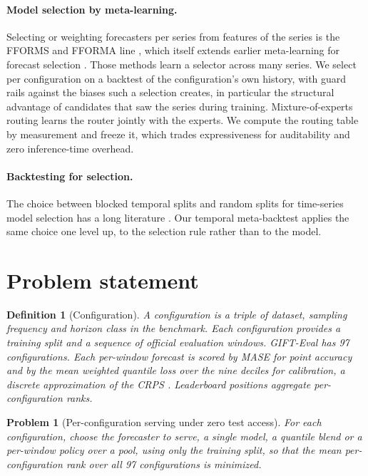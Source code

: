 \documentclass[11pt]{article}
\newtheorem{definition}{Definition}
\newtheorem{problem}{Problem}
\begin{document}
\paragraph{Model selection by meta-learning.} Selecting or weighting
forecasters per series from features of the series is the FFORMS and
FFORMA line \citep{talagala2023fforms,montero2020fforma}, which itself
extends earlier meta-learning for forecast selection
\citep{lemke2010metalearning}. Those methods learn a selector across many
series. We select per configuration on a backtest of the configuration's
own history, with guard rails against the biases such a selection creates,
in particular the structural advantage of candidates that saw the series
during training. Mixture-of-experts routing \citep{shazeer2017moe} learns
the router jointly with the experts. We compute the routing table by
measurement and freeze it, which trades expressiveness for auditability
and zero inference-time overhead.

\paragraph{Backtesting for selection.} The choice between blocked temporal
splits and random splits for time-series model selection has a long
literature \citep{tashman2000outofsample,bergmeir2012crossvalidation,
cerqueira2020evaluating}. Our temporal meta-backtest applies the same choice one level up, to the
selection rule rather than to the model.

\section{Problem statement}
\label{sec:problem}

\begin{definition}[Configuration]
\label{def:config}
A configuration is a triple of dataset, sampling frequency and horizon
class in the benchmark. Each configuration provides a training split and a
sequence of official evaluation windows. GIFT-Eval has 97 configurations.
Each per-window forecast is scored by MASE \citep{hyndman2006mase} for
point accuracy and by the mean weighted quantile loss over the nine
deciles for calibration, a discrete approximation of the CRPS
\citep{gneiting2007scoring}. Leaderboard positions aggregate
per-configuration ranks.
\end{definition}

\begin{problem}[Per-configuration serving under zero test access]
\label{prob:main}
For each configuration, choose the forecaster to serve, a single model, a
quantile blend or a per-window policy over a pool, using only the training
split, so that the mean per-configuration rank over all 97 configurations
is minimized.
\end{problem}
\end{document}

